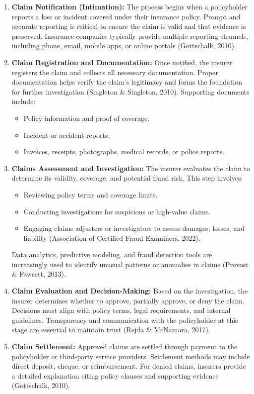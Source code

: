 \documentclass[12pt,a4paper]{article}
\begin{document}
\begin{enumerate}
    \item \textbf{Claim Notification (Intimation):} The process begins when a policyholder reports a loss or incident covered under their insurance policy. Prompt and accurate reporting is critical to ensure the claim is valid and that evidence is preserved. Insurance companies typically provide multiple reporting channels, including phone, email, mobile apps, or online portals (Gottschalk, 2010).
    \item \textbf{Claim Registration and Documentation:} Once notified, the insurer registers the claim and collects all necessary documentation. Proper documentation helps verify the claim’s legitimacy and forms the foundation for further investigation (Singleton \& Singleton, 2010). Supporting documents include:
    \begin{itemize}
        \item Policy information and proof of coverage.
        \item Incident or accident reports.
        \item Invoices, receipts, photographs, medical records, or police reports.
    \end{itemize}
    \item \textbf{Claims Assessment and Investigation:} The insurer evaluates the claim to determine its validity, coverage, and potential fraud risk. This step involves:
    \begin{itemize}
        \item Reviewing policy terms and coverage limits.
        \item Conducting investigations for suspicious or high-value claims.
        \item Engaging claims adjusters or investigators to assess damages, losses, and liability (Association of Certified Fraud Examiners, 2022).
    \end{itemize}
    Data analytics, predictive modeling, and fraud detection tools are increasingly used to identify unusual patterns or anomalies in claims (Provost \& Fawcett, 2013).
    \item \textbf{Claim Evaluation and Decision-Making:} Based on the investigation, the insurer determines whether to approve, partially approve, or deny the claim. Decisions must align with policy terms, legal requirements, and internal guidelines. Transparency and communication with the policyholder at this stage are essential to maintain trust (Rejda \& McNamara, 2017).
    \item \textbf{Claim Settlement:} Approved claims are settled through payment to the policyholder or third-party service providers. Settlement methods may include direct deposit, cheque, or reimbursement. For denied claims, insurers provide a detailed explanation citing policy clauses and supporting evidence (Gottschalk, 2010).

\end{enumerate}
\end{document}
